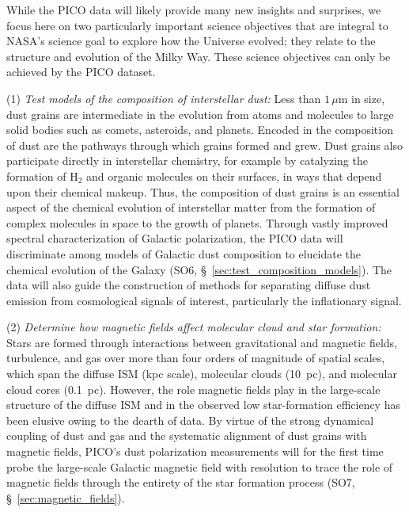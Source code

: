 \documentclass[PICOReport.tex]{subfiles}
\begin{document}
While the PICO data will likely provide many new insights and surprises, we focus here on two particularly important science objectives that are integral to NASA's science goal to explore how the Universe evolved; they relate to the structure and evolution of the Milky Way. These science objectives can only be achieved by the PICO dataset.

(1) {\em Test models of the composition of interstellar dust:} 
Less than $1\,\mu$m in size, dust grains are intermediate in the evolution from atoms and molecules to large solid bodies such as comets, asteroids, and planets. Encoded in the composition of dust are the pathways through which grains formed and grew. Dust grains also participate directly in interstellar chemistry, for example by catalyzing the formation of H$_2$ and organic molecules on their surfaces, in ways that depend upon their chemical makeup. Thus, the composition of dust grains is an essential aspect of the chemical evolution of interstellar matter from the formation of complex molecules in space to the growth of planets. Through vastly improved spectral characterization of Galactic polarization, the PICO data will discriminate among models of Galactic dust composition to elucidate the chemical evolution of the Galaxy (SO6, \S~\ref{sec:test_composition_models}). The data will also guide the construction of methods for separating diffuse dust emission from cosmological signals of interest, particularly the inflationary signal. 

(2) {\em Determine how magnetic fields affect molecular cloud and star formation:}
Stars are formed through interactions between gravitational and magnetic fields, turbulence, and gas over more than four orders of magnitude of spatial scales, which span the diffuse ISM (kpc scale), molecular clouds (10~pc), and molecular cloud cores (0.1~pc). However, the role magnetic fields play in the large-scale structure of the diffuse \ac{ISM} and in the observed low star-formation efficiency has been elusive owing to the dearth of data. By virtue of the strong dynamical coupling of dust and gas and the systematic alignment of dust grains with magnetic fields, PICO's dust polarization measurements will for the first time probe the large-scale Galactic magnetic field with resolution to trace the role of magnetic fields through the entirety of the star formation process (SO7, \S~\ref{sec:magnetic_fields}). 
\end{document}
